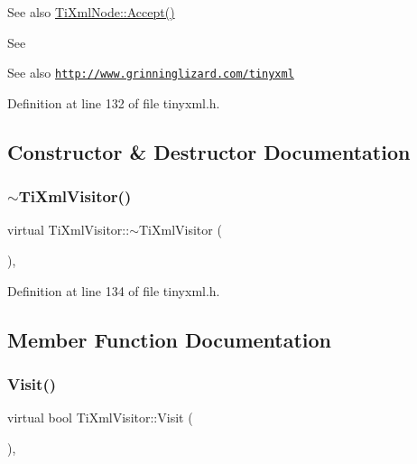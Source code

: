 \begin{DoxySeeAlso}{See also}
\hyperlink{class_ti_xml_node_acc0f88b7462c6cb73809d410a4f5bb86}{Ti\+Xml\+Node\+::\+Accept()}
\end{DoxySeeAlso}
See \begin{DoxySeeAlso}{See also}
\href{http://www.grinninglizard.com/tinyxml}{\tt http\+://www.\+grinninglizard.\+com/tinyxml} 
\end{DoxySeeAlso}


Definition at line 132 of file tinyxml.\+h.



\subsection{Constructor \& Destructor Documentation}
\hypertarget{class_ti_xml_visitor_a276c739ec4701f27c3f86b8ead095e5a}{}\label{class_ti_xml_visitor_a276c739ec4701f27c3f86b8ead095e5a} 
\subsubsection{\texorpdfstring{$\sim$\+Ti\+Xml\+Visitor()}{~TiXmlVisitor()}}
{\footnotesize\ttfamily virtual Ti\+Xml\+Visitor\+::$\sim$\+Ti\+Xml\+Visitor (\begin{DoxyParamCaption}{ }\end{DoxyParamCaption})\hspace{0.3cm}{\ttfamily [inline]}, {\ttfamily [virtual]}}



Definition at line 134 of file tinyxml.\+h.



\subsection{Member Function Documentation}
\hypertarget{class_ti_xml_visitor_afad71c71ce6473fb9b4b64cd92de4a19}{}\label{class_ti_xml_visitor_afad71c71ce6473fb9b4b64cd92de4a19} 
\subsubsection{\texorpdfstring{Visit()}{Visit()}\hspace{0.1cm}{\footnotesize\ttfamily [1/4]}}
{\footnotesize\ttfamily virtual bool Ti\+Xml\+Visitor\+::\+Visit (\begin{DoxyParamCaption}\item[{const \hyperlink{class_ti_xml_declaration}{Ti\+Xml\+Declaration} \&}]{ }\end{DoxyParamCaption})\hspace{0.3cm}{\ttfamily [inline]}, {\ttfamily [virtual]}}



